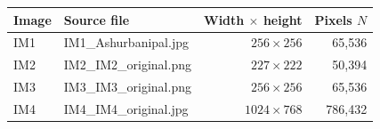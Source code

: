\begin{center}
{\small
\setlength{\tabcolsep}{4pt}
\begin{tabular}{@{}llrr@{}}
\toprule
Image & Source file & Width $\times$ height & Pixels $N$ \\
\midrule
IM1 & IM1\_Ashurbanipal.jpg & $256\times256$ & 65,536 \\
IM2 & IM2\_IM2\_original.png & $227\times222$ & 50,394 \\
IM3 & IM3\_IM3\_original.png & $256\times256$ & 65,536 \\
IM4 & IM4\_IM4\_original.jpg & $1024\times768$ & 786,432 \\
\bottomrule
\end{tabular}}
\end{center}
